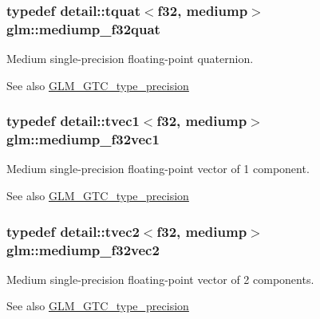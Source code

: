 \subsubsection[{\texorpdfstring{mediump\+\_\+f32quat}{mediump_f32quat}}]{\setlength{\rightskip}{0pt plus 5cm}typedef detail\+::tquat$<$f32, mediump$>$ {\bf glm\+::mediump\+\_\+f32quat}}\hypertarget{group__gtc__type__precision_gab038e3482ca401bca2b2634c96f44f09}{}\label{group__gtc__type__precision_gab038e3482ca401bca2b2634c96f44f09}
Medium single-\/precision floating-\/point quaternion. \begin{DoxySeeAlso}{See also}
\hyperlink{group__gtc__type__precision}{G\+L\+M\+\_\+\+G\+T\+C\+\_\+type\+\_\+precision} 
\end{DoxySeeAlso}
\subsubsection[{\texorpdfstring{mediump\+\_\+f32vec1}{mediump_f32vec1}}]{\setlength{\rightskip}{0pt plus 5cm}typedef detail\+::tvec1$<$f32, mediump$>$ {\bf glm\+::mediump\+\_\+f32vec1}}\hypertarget{group__gtc__type__precision_gaf3d4077b241fbcab529fb0e0d88c0df6}{}\label{group__gtc__type__precision_gaf3d4077b241fbcab529fb0e0d88c0df6}
Medium single-\/precision floating-\/point vector of 1 component. \begin{DoxySeeAlso}{See also}
\hyperlink{group__gtc__type__precision}{G\+L\+M\+\_\+\+G\+T\+C\+\_\+type\+\_\+precision} 
\end{DoxySeeAlso}
\subsubsection[{\texorpdfstring{mediump\+\_\+f32vec2}{mediump_f32vec2}}]{\setlength{\rightskip}{0pt plus 5cm}typedef detail\+::tvec2$<$f32, mediump$>$ {\bf glm\+::mediump\+\_\+f32vec2}}\hypertarget{group__gtc__type__precision_gaf53d380f948fdbb540eab960f2ad4b58}{}\label{group__gtc__type__precision_gaf53d380f948fdbb540eab960f2ad4b58}
Medium single-\/precision floating-\/point vector of 2 components. \begin{DoxySeeAlso}{See also}
\hyperlink{group__gtc__type__precision}{G\+L\+M\+\_\+\+G\+T\+C\+\_\+type\+\_\+precision} 
\end{DoxySeeAlso}
